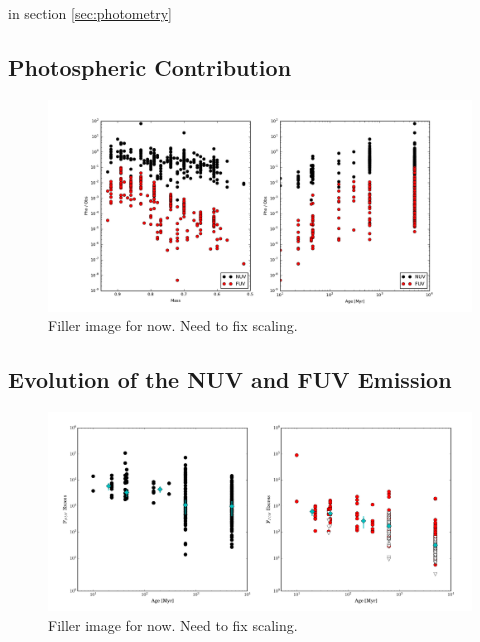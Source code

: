 \documentclass[twocolumn]{aastex62}
\begin{document}
in section \ref{sec:photometry}

\subsection{Photospheric Contribution}

\begin{figure}[h]
\includegraphics[width=\linewidth]{phot_obs.pdf}
\caption{Filler image for now. Need to fix scaling. \label{fig:phot_obs}}
\end{figure}

\subsection{Evolution of the NUV and FUV Emission}

\begin{figure}[h]
\includegraphics[width=\linewidth]{ffdensity_age_NO_J.pdf}
\caption{Filler image for now. Need to fix scaling. \label{fig:ffdensity_age}}
\end{figure}
\end{document}
